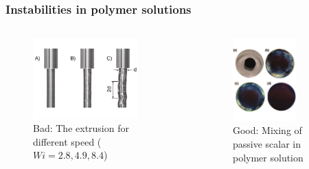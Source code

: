 \begin{frame}
  \frametitle{Instabilities in polymer solutions}
  \begin{columns}
    \begin{column}{0.5\textwidth}
      \begin{figure}[t]
        \centering
        \includegraphics[width=0.8\textwidth]{img/melt.pdf}
        \caption{\alert{Bad}: The extrusion for different speed ($Wi=2.8, 4.9,
          8.4$)~\footnotemark}
        \label{fig:snap}
      \end{figure}
    \end{column}
    \begin{column}{0.5\textwidth}
      \begin{figure}[t]
        \centering
        \includegraphics[width=0.7\textwidth]{img/mix2.pdf}
        \caption{\alert{Good}: Mixing of passive scalar in polymer solution~\footnotemark}
        \label{fig:snap}
      \end{figure}
    \end{column}
  \end{columns}
\end{frame}

